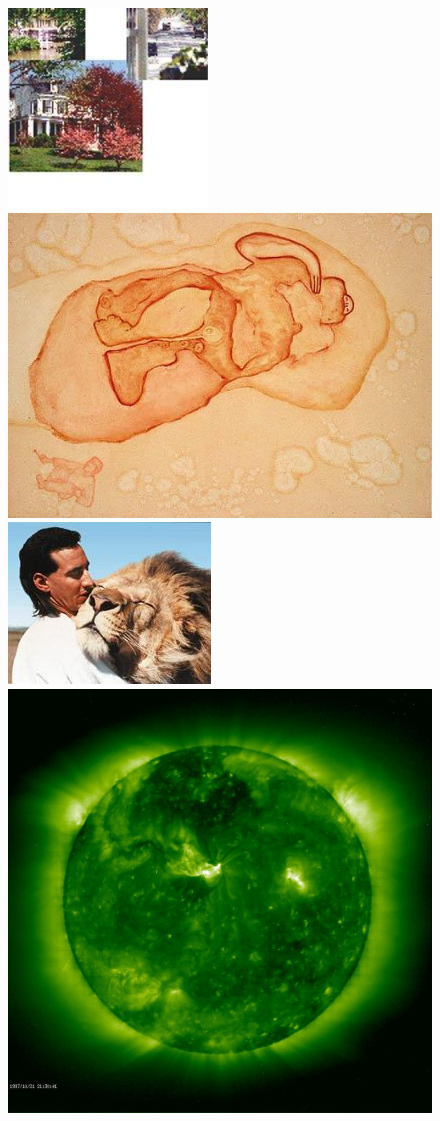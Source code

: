 \documentclass[oneside,a4paper,english,links]{amca}
\begin{document}
\begin{figure}[htb]
\centering
\includegraphics[scale=0.5]{exps/100sample/image_0004}
\includegraphics[scale=0.2]{exps/100sample/image_0019}
\includegraphics[scale=0.5]{exps/100sample/image_0027}
\includegraphics[scale=0.1]{exps/100sample/image_0309}

\end{figure}
\end{document}
